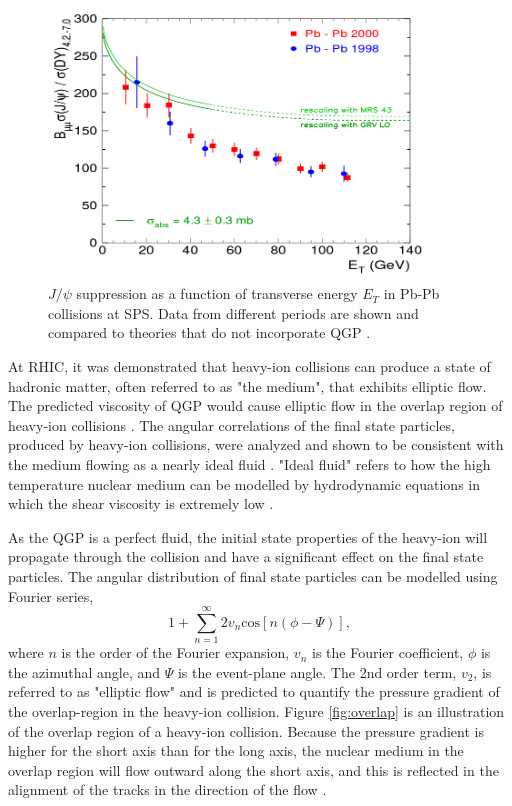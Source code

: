 \begin{figure}[h!]
\begin{centering}
\includegraphics[width=4in]{Chapter1/importfigs/jpsiSupp.png}
\par\end{centering}
\caption{$J/\psi$ suppression as a function of transverse energy $E_T$ in Pb-Pb collisions at SPS. Data from different periods are shown and compared to theories that do not incorporate QGP \cite{spsHI}. \label{fig:jpsiSupp}}
\end{figure}

At RHIC, it was demonstrated that heavy-ion collisions can produce a state of hadronic matter, often referred to as "the medium", that exhibits elliptic flow. The predicted viscosity of QGP would cause elliptic flow in the overlap region of heavy-ion collisions \cite{phobosFlow}. The angular correlations of the final state particles, produced by heavy-ion collisions, were analyzed and shown to be consistent with the medium flowing as a nearly ideal fluid \cite{Chatrchyan:2013nka}. "Ideal fluid" refers to how the high temperature nuclear medium can be modelled by hydrodynamic equations in which the shear viscosity is extremely low \cite{Karsch:2000kv}.

As the QGP is a perfect fluid, the initial state properties of the heavy-ion will propagate through the collision and have a significant effect on the final state particles. The angular distribution of final state particles can be modelled using Fourier series,
\begin{equation}
 1+\sum^{\infty}_{n=1}2v_{n}\mathrm{cos}\left[n\left(\phi-\Psi\right)\right],
\end{equation}
where $n$ is the order of the Fourier expansion, $v_n$ is the Fourier coefficient, $\phi$ is the azimuthal angle, and $\Psi$ is the event-plane angle. The 2nd order term, $v_2$, is referred to as "elliptic flow" and is predicted to quantify the pressure gradient of the overlap-region in the heavy-ion collision. Figure \ref{fig:overlap} is an illustration of the overlap region of a heavy-ion collision. Because the pressure gradient is higher for the short axis than for the long axis, the nuclear medium in the overlap region will flow outward along the short axis, and this is reflected in the alignment of the tracks in the direction of the flow \cite{Abelev:2012ola,Ollitrault:1992bk,Sorensen:2009cz,Bhalerao:2003yq,Borghini:2001zr,Ackermann:2000tr,Borghini:2004ke}. 

